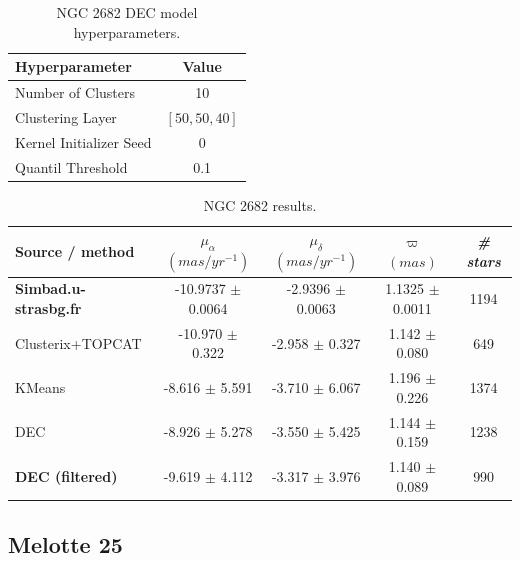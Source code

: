 \documentclass[11pt, a4paper, english]{book}
\begin{document}
\newpage

\vfill

\begin{table}[h!]
  \begin{center}
    \begin{tabular}{l|c}
      \textbf{Hyperparameter} & \textbf{Value} \\
      \hline
      Number of Clusters & 10 \\
      Clustering Layer & $\left[ 50, 50, 40 \right]$ \\
      Kernel Initializer Seed & 0 \\
      Quantil Threshold & 0.1 \\
    \end{tabular}
    \caption{NGC 2682 DEC model hyperparameters.}
    \label{tab:hyperparameters_ngc_2682}
  \end{center}
\end{table}

\begin{table}[h!]
  \begin{center}
    \begin{tabular}{l|c|c|c|c}
      \textbf{Source / method} & \textbf{$\mu_{\alpha}$ $(mas/yr^{-1})$} & \textbf{$\mu_{\delta}$ $(mas/yr^{-1})$} & \textbf{$\varpi$ $(mas)$} & \emph{\# stars} \\
      \hline
      \textbf{Simbad.u-strasbg.fr} & -10.9737 $\pm$ 0.0064 & -2.9396 $\pm$ 0.0063 & 1.1325 $\pm$ 0.0011 & 1194 \\
      Clusterix+TOPCAT & -10.970 $\pm$ 0.322 & -2.958 $\pm$ 0.327 & 1.142 $\pm$ 0.080 & 649 \\
      KMeans & -8.616 $\pm$ 5.591 & -3.710 $\pm$ 6.067 & 1.196 $\pm$ 0.226 & 1374 \\
      DEC & -8.926 $\pm$ 5.278 & -3.550 $\pm$ 5.425 & 1.144 $\pm$ 0.159 & 1238 \\
      \textbf{DEC (filtered)} & -9.619 $\pm$ 4.112 & -3.317 $\pm$ 3.976 & 1.140 $\pm$ 0.089 & 990 \\
    \end{tabular}
    \caption{NGC 2682 results.}
    \label{tab:results_ngc_2682}
  \end{center}
\end{table}

\vfill

\newpage

\subsection{Melotte 25}
\end{document}
